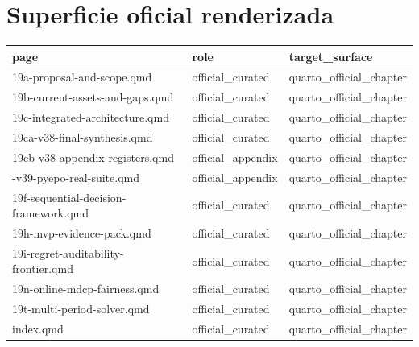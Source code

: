 \documentclass[
  spanish,
  11pt,
  letterpaper,
]{scrbook}
\newcounter{none} %
\theoremstyle{plain}
\theoremstyle{remark}
\begin{document}
\section{Superficie oficial
renderizada}\label{superficie-oficial-renderizada}

{\def\LTcaptype{none} %
\begin{longtable}[]{@{}
  >{\raggedright\arraybackslash}p{}
  >{\raggedright\arraybackslash}p{}
  >{\raggedright\arraybackslash}p{}@{}}
\toprule\noalign{}
\begin{minipage}[b]{\linewidth}\raggedright
page
\end{minipage} & \begin{minipage}[b]{\linewidth}\raggedright
role
\end{minipage} & \begin{minipage}[b]{\linewidth}\raggedright
target\_surface
\end{minipage} \\
\midrule\noalign{}
\endhead
\bottomrule\noalign{}
\endlastfoot
19a-proposal-and-scope.qmd & official\_curated &
quarto\_official\_chapter \\
19b-current-assets-and-gaps.qmd & official\_curated &
quarto\_official\_chapter \\
19c-integrated-architecture.qmd & official\_curated &
quarto\_official\_chapter \\
19ca-v38-final-synthesis.qmd & official\_curated &
quarto\_official\_chapter \\
19cb-v38-appendix-registers.qmd & official\_appendix &
quarto\_official\_chapter \\
19cc-v39-pyepo-real-suite.qmd & official\_appendix &
quarto\_official\_chapter \\
19f-sequential-decision-framework.qmd & official\_curated &
quarto\_official\_chapter \\
19h-mvp-evidence-pack.qmd & official\_curated &
quarto\_official\_chapter \\
19i-regret-auditability-frontier.qmd & official\_curated &
quarto\_official\_chapter \\
19n-online-mdcp-fairness.qmd & official\_curated &
quarto\_official\_chapter \\
19t-multi-period-solver.qmd & official\_curated &
quarto\_official\_chapter \\
index.qmd & official\_curated & quarto\_official\_chapter \\
\end{longtable}
}
\end{document}
